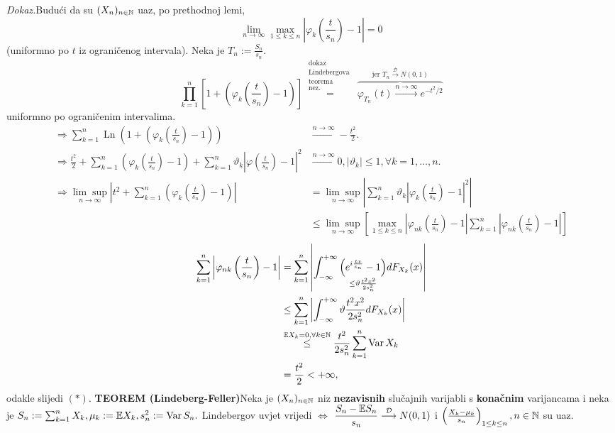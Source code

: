 \documentclass{article}
\newcommand{\Var}{\operatorname{Var}}
\newcommand{\Ln}{\operatorname{Ln}}
\newcommand{\mylimsup}{\underset{n\to\infty}{\lim\sup}}
\begin{document}
\textit{Dokaz.}\newline Budući da su \((X_n)_{n\in\Bbb N}\) uaz, po prethodnoj lemi, \[\lim_{n\to\infty}\max_{1\le k\le n}\left|\varphi_k\left(\frac{t}{s_n}\right)-1\right|=0\] (uniformno po \(t\) iz ograničenog intervala). Neka je \(T_n:=\frac{S_n}{s_n}.\) \[\prod_{k=1}^n\left[1+\left(\varphi_k\left(\frac{t}{s_n}\right)-1\right)\right]\overset{\substack{\text{dokaz }\\\text{Lindebergova }\\\text{teorema }\\\text{nez.}}}{=}\overbrace{\varphi_{T_n}(t)\overset{n\to\infty}{\longrightarrow}e^{-t^2/2}}^{\text{jer }T_n\overset{\mathcal D}{\longrightarrow}N(0,1)}\] uniformno po ograničenim intervalima. \[\begin{aligned}\Rightarrow\sum_{k=1}^n\Ln \left(1+\left(\varphi_k\left(\frac{t}{s_n}\right)-1\right)\right)&\overset{n\to\infty}{\longrightarrow}-\frac{t^2}2.\\\Rightarrow\frac{t^2}2+\sum_{k=1}^n\left(\varphi_k\left(\frac{t}{s_n}\right)-1\right)+\sum_{k=1}^n\vartheta_k\left|\varphi\left(\frac{t}{s_n}\right)-1\right|^2&\overset{n\to\infty}{\longrightarrow}0,|\vartheta_k|\le 1,\forall k=1,\ldots,n.\\\Rightarrow\mylimsup \left|t^2+\sum_{k=1}^n\left(\varphi_k\left(\frac{t}{s_n}\right)-1\right)\right|&=\mylimsup \left|\sum_{k=1}^n\vartheta_k\left|\varphi_k\left(\frac{t}{s_n}\right)-1\right|^2\right|\\&\le\mylimsup \left[\max_{1\le k\le n}\left|\varphi_{nk}\left(\frac{t}{s_n}\right)-1\right|\sum_{k=1}^n\left|\varphi_{nk}\left(\frac{t}{s_n}\right)-1\right|\right]\end{aligned}\] 
\[\begin{aligned}\sum_{k=1}^n\left|\varphi_{nk}\left(\frac{t}{s_n}\right)-1\right|&=\sum_{k=1}^n\left|\int_{-\infty}^{+\infty}\underset{\le\vartheta\frac{t^2x^2}{2s_n^2}}{\left(e^{i\frac{tx}{s_n}}-1\right)}dF_{X_k}(x)\right|\\&\le\sum_{k=1}^n\left|\int_{-\infty}^{+\infty}\vartheta\frac{t^2x^2}{2s_n^2}dF_{X_k}(x)\right|\\&\overset{\Bbb EX_k=0,\forall k\in\Bbb N}{\le}\frac{t^2}{2s_n^2}\sum_{k=1}^n\Var X_k\\&=\frac{t^2}2<+\infty,\end{aligned}\] odakle slijedi \((*).\)\newline\newline
\textbf{TEOREM (Lindeberg-Feller)}\newline Neka je \((X_n)_{n\in\Bbb N}\) niz \textbf{nezavisnih} slučajnih varijabli s \textbf{konačnim} varijancama  i neka je \(S_n:=\sum_{k=1}^nX_k,\mu_k:=\Bbb EX_k,s_n^2:=\Var S_n.\) Lindebergov uvjet vrijedi \(\Leftrightarrow\) \(\dfrac{S_n-\Bbb ES_n}{s_n}\overset{\mathcal D}{\longrightarrow}N(0,1)\) i \(\left(\frac{X_k-\mu_k}{s_n}\right)_{1\le k\le n},n\in\Bbb N\) su uaz.\newline\newline
\end{document}
